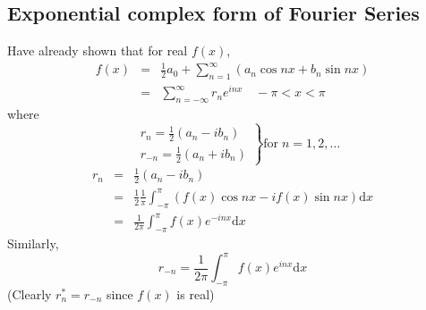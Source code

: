 \documentclass[12pt]{report}
\theoremstyle{definition}
\begin{document}
\subsection{Exponential complex form of Fourier Series}
Have already shown that for real $f(x)$,
\begin{eqnarray*}
    f(x) &=& \frac{1}{2} a_0 + \sum_{n=1}^{\infty} (a_n \cos{nx} + b_n \sin{nx}) \\
         &=& \sum_{n=-\infty}^{\infty} r_n e^{inx} \quad -\pi < x < \pi
\end{eqnarray*}
where\[
    \left. 
    \begin{align*}
        & r_n = \frac{1}{2} (a_n - ib_n) \\
        & r_{-n} = \frac{1}{2} (a_n + ib_n)
    \end{align*}
\right\} \text{for} \;n = 1,2,\ldots
\]
\begin{eqnarray*}
    r_n &=& \frac{1}{2} (a_n - ib_n) \\
        &=& \frac{1}{2} \frac{1}{\pi} \int_{-\pi}^{\pi} (f(x)\cos{nx} - if(x)\sin{nx}) \mathrm{d}x \\
        &=& \frac{1}{2\pi}\int_{-\pi}^{\pi} f(x) e^{-inx}\mathrm{d}x
\end{eqnarray*}
Similarly, \[
    r_{-n} = \frac{1}{2\pi}\int_{-\pi}^{\pi} f(x) e^{inx}\mathrm{d}x
\]
(Clearly $r_n^{*} = r_{-n}$ since $f(x)$ is real)
\medskip
\\
\end{document}
